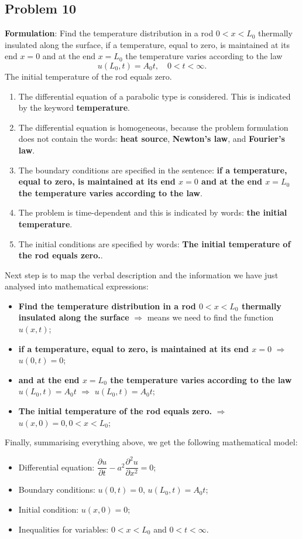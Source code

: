 \subsection{Problem 10}

{\bfseries Formulation}: Find the temperature distribution in a rod $0<x<L_{0}$ thermally insulated along the surface, if a temperature, equal to zero, is maintained at its end $x=0$ and at the end $x=L_{0}$ the temperature varies according to the law
\begin{equation*}
u(L_{0},t)=A_{0}t, \quad 0<t<\infty.
\end{equation*}
The initial temperature of the rod equals zero.
\begin{enumerate}
\item The differential equation of a parabolic type is considered. This is indicated by the keyword {\bfseries temperature}.
\item The differential equation is homogeneous, because the problem formulation does not contain the words: {\bfseries heat source}, {\bfseries Newton's law}, and {\bfseries Fourier's law}.
\item The boundary conditions are specified in the sentence: {\bfseries if a temperature, equal to zero, is maintained at its end $x=0$ and at the end $x=L_{0}$ the temperature varies according to the law}.
\item The problem is time-dependent and this is indicated by words: {\bfseries the initial temperature}.
\item The initial conditions are specified by words: {\bfseries The initial temperature of the rod equals zero.}.
\end{enumerate}
Next step is to map the verbal description and the information we have just analysed into mathematical expressions:
\begin{itemize}
\item {\bfseries Find the temperature distribution in a rod $0<x<L_{0}$ thermally insulated along the surface} $\Longrightarrow$ means we need to find the function $u(x,t)$;
\item {\bfseries  if a temperature, equal to zero, is maintained at its end $x=0$} $\Longrightarrow$ $u(0,t)=0$;
\item {\bfseries  and at the end $x=L_{0}$ the temperature varies according to the law $u(L_{0},t)=A_{0}t$} $\Longrightarrow$ $u(L_{0},t)=A_{0}t$;
\item {\bfseries The initial temperature of the rod equals zero.} $\Longrightarrow$ $u(x,0)=0, 0<x<L_{0}$;
\end{itemize}
Finally, summarising everything above, we get the following mathematical model:
\begin{itemize}
\item Differential equation: $\dfrac{\partial u}{\partial t} - a^{2}\dfrac{\partial^{2} u}{\partial x^{2}}=0$;
\item Boundary conditions: $u(0,t)=0$, $u(L_{0},t)=A_{0}t$;
\item Initial condition: $u(x,0)=0$;
\item Inequalities for variables: $0<x<L_{0}$ and $0<t<\infty$.
\end{itemize}
